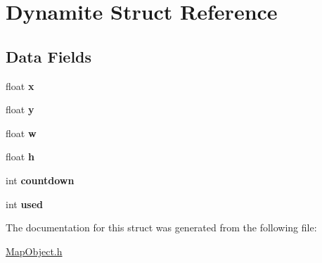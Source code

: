 \hypertarget{struct_dynamite}{}\section{Dynamite Struct Reference}
\label{struct_dynamite}
\subsection*{Data Fields}
\begin{DoxyCompactItemize}
\item 
\hypertarget{struct_dynamite_ad0da36b2558901e21e7a30f6c227a45e}{}float {\bfseries x}\label{struct_dynamite_ad0da36b2558901e21e7a30f6c227a45e}

\item 
\hypertarget{struct_dynamite_aa4f0d3eebc3c443f9be81bf48561a217}{}float {\bfseries y}\label{struct_dynamite_aa4f0d3eebc3c443f9be81bf48561a217}

\item 
\hypertarget{struct_dynamite_a56eca241e2896b9f57a79589e76fd24b}{}float {\bfseries w}\label{struct_dynamite_a56eca241e2896b9f57a79589e76fd24b}

\item 
\hypertarget{struct_dynamite_a85f2f1bd58b3b44ffdf3881823393959}{}float {\bfseries h}\label{struct_dynamite_a85f2f1bd58b3b44ffdf3881823393959}

\item 
\hypertarget{struct_dynamite_a400154256b5e9d23451c4d0f8ecade1e}{}int {\bfseries countdown}\label{struct_dynamite_a400154256b5e9d23451c4d0f8ecade1e}

\item 
\hypertarget{struct_dynamite_a5810b6407672b8e7aeba609b4bb649de}{}int {\bfseries used}\label{struct_dynamite_a5810b6407672b8e7aeba609b4bb649de}

\end{DoxyCompactItemize}


The documentation for this struct was generated from the following file\+:\begin{DoxyCompactItemize}
\item 
\hyperlink{_map_object_8h}{Map\+Object.\+h}\end{DoxyCompactItemize}
